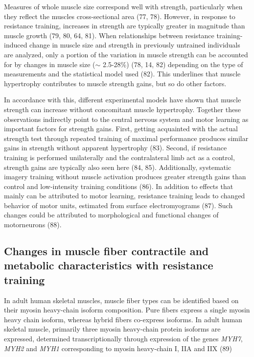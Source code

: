 \documentclass[twoside,10pt]{gihclass} %
\begin{document}
Measures of whole muscle size correspond well with strength, particularly when they reflect the muscles cross-sectional area
(77, 78).
However, in response to resistance training, increases in strength are typically greater in magnitude than muscle growth
(79, 80, 64, 81).
When relationships between resistance training-induced change in muscle size and strength in previously untrained individuals are analyzed, only a portion of the variation in muscle strength can be accounted for by changes in muscle size (\(\sim\) 2.5-28\%)
(78, 14, 82)
depending on the type of measurements and the statistical model used
(82).
This underlines that muscle hypertrophy contributes to muscle strength gains, but so do other factors.

In accordance with this, different experimental models have shown that muscle strength can increase without concomitant muscle hypertrophy.
Together these observations indirectly point to the central nervous system and motor learning as important factors for strength gains.
First, getting acquainted with the actual strength test through repeated training of maximal performance produces similar gains in strength without apparent hypertrophy
(83).
Second, if resistance training is performed unilaterally and the contralateral limb act as a control, strength gains are typically also seen here
(84, 85).
Additionally, systematic imagery training without muscle activation produces greater strength gains than control and low-intensity training conditions
(86).
In addition to effects that mainly can be attributed to motor learning, resistance training leads to changed behavior of motor units, estimated from surface electromyograms
(87).
Such changes could be attributed to morphological and functional changes of motorneurons
(88).

\hypertarget{changes-in-muscle-fiber-contractile-and-metabolic-characteristics-with-resistance-training}{%
\subsection{Changes in muscle fiber contractile and metabolic characteristics with resistance training}\label{changes-in-muscle-fiber-contractile-and-metabolic-characteristics-with-resistance-training}}

In adult human skeletal muscles, muscle fiber types can be identified based on their myosin heavy-chain isoform composition. Pure fibers express a single myosin heavy chain isoform, whereas hybrid fibers co-express isoforms.
In adult human skeletal muscle, primarily three myosin heavy-chain protein isoforms are expressed, determined transcriptionally through expression of the genes \emph{MYH7}, \emph{MYH2} and \emph{MYH1} corresponding to myosin heavy-chain I, IIA and IIX
(89)
\end{document}
